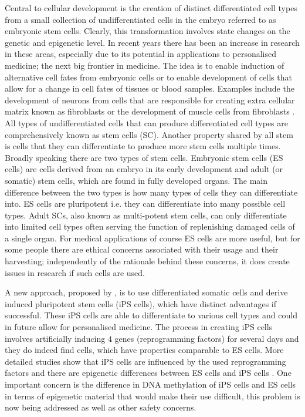 Central to cellular development is the creation of distinct differentiated cell types from a small collection of undifferentiated cells in the embryo referred to as embryonic stem cells. Clearly, this transformation involves state changes on the genetic and epigenetic level. In recent years there has been an increase in research in these areas, especially due to its potential in applications to personalised medicine; the next big frontier in medicine. The idea is to enable induction of alternative cell fates from embryonic cells or to enable development of cells that allow for a change in cell fates of tissues or blood samples. Examples include the development of neurons from cells that are responsible for creating extra cellular matrix known as fibroblasts \citep{Vierbuchen:2010fa, Pang:2011ce} or the development of muscle cells from fibroblasts \citep{Ieda:2010ir, Efe:2011bpa}. All types of undifferentiated cells that can produce differentiated cell types are comprehensively known as stem cells (SC). Another property shared by all stem is cells that they can differentiate to produce more stem cells multiple times. Broadly speaking there are two types of stem cells. Embryonic stem cells (ES cells) are cells derived from an embryo in its early development and  adult (or somatic) stem cells, which are found in fully developed organs. The main difference between the two types is how many types of cells they can differentiate into. ES cells are pluripotent i.e. they can differentiate into many possible cell types. Adult SCs, also known as multi-potent stem cells, can only differentiate into limited cell types often serving the function of replenishing damaged cells of a single organ. For medical applications of course ES cells are more useful, but for some people there are ethical concerns associated with their usage and their harvesting; independently of the rationale behind these concerns, it does create issues in research if such cells are used.

A new approach, proposed by \cite{Takahashi:2006hi}, is to use differentiated somatic cells and derive induced pluripotent stem cells (iPS cells), which have distinct advantages if successful. These iPS cells are able to differentiate to various cell types and could in future allow for personalised medicine. The process in creating iPS cells involves artificially inducing $4$ genes (reprogramming factors) for several days and they do indeed find cells, which have properties comparable to ES cells. More detailed studies show that iPS cells are influenced by the used reprogramming factors and there are epigenetic differences between ES cells and iPS cells \citep{Carey:2011bs, Bock:2011kx}. One important concern is the difference in DNA methylation of iPS cells and ES cells in terms of epigenetic material that would make their use difficult, this problem is now being addressed \citep{Bagci:2013ey} as well as other safety concerns.

